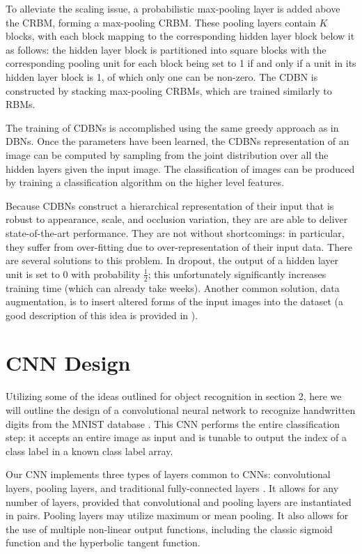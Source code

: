 \documentclass[10pt,twocolumn,letterpaper]{article}
\begin{document}
To alleviate the scaling issue, a probabilistic max-pooling layer is added above the CRBM,
forming a max-pooling CRBM.
These pooling layers contain $K$ blocks, with each block mapping to the corresponding hidden
layer block below it as follows: the hidden layer block is partitioned into square blocks with the
corresponding pooling unit for each block being set to 1 if and only if a unit in its hidden layer
block is 1, of which only one can be non-zero.
The CDBN is constructed by stacking max-pooling CRBMs, which are trained similarly to RBMs.

The training of CDBNs is accomplished using the same greedy approach as in DBNs.
Once the parameters have been learned, the CDBNs representation of an image can be computed
by sampling from the joint distribution over all the hidden layers given the input image.
The classification of images can be produced by training a classification algorithm
on the higher level features.

Because CDBNs construct a hierarchical representation of their input that is robust
to appearance, scale, and occlusion variation, they are are able to deliver
state-of-the-art performance.
They are not without shortcomings: in particular, they suffer from over-fitting due
to over-representation of their input data.
There are several solutions to this problem. In dropout, the output of a hidden layer
unit is set to 0 with probability $\frac{1}{2}$; this unfortunately significantly increases training
time (which can already take weeks). Another common solution, data augmentation,
is to insert altered forms of the input images into the dataset
(a good description of this idea is provided in \cite{Verydeep}).

\section{CNN Design}

Utilizing some of the ideas outlined for object recognition in section 2,
here we will outline the design of a convolutional neural network to recognize
handwritten digits from the MNIST database \cite{MNIST}.
This CNN performs the entire classification step: it accepts an entire image as input
and is tunable to output the index of a class label in a known class label array.

Our CNN implements three types of layers common to CNNs: convolutional layers, pooling layers,
and traditional fully-connected layers \cite{ImageNet} \cite{Verydeep}.
It allows for any number of layers, provided that convolutional and pooling layers are
instantiated in pairs.
Pooling layers may utilize maximum or mean pooling.
It also allows for the use of multiple non-linear output functions,
including the classic sigmoid function and the hyperbolic tangent function.
\end{document}

